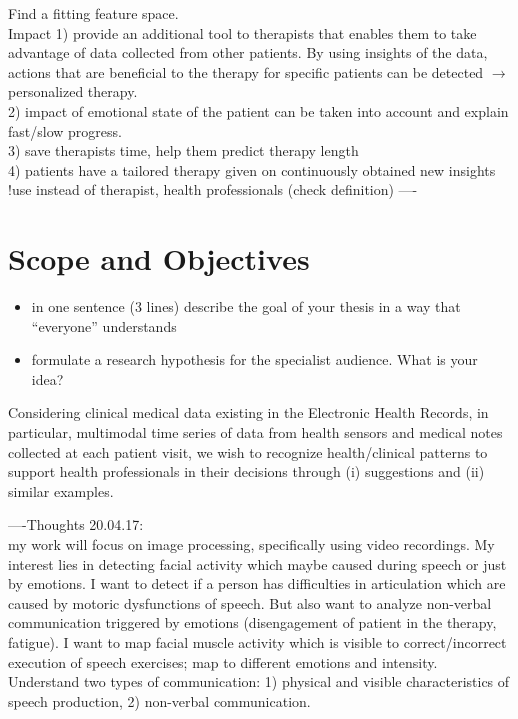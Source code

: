 Find a fitting feature space. \\


Impact 1) provide an additional tool to therapists that enables them to take advantage of data collected from other patients. By using insights of the data, actions that are beneficial to the therapy for specific patients can be detected $\rightarrow$ personalized therapy.\\
2) impact of emotional state of the patient can be taken into account and explain fast/slow progress.\\
3) save therapists time, help them predict therapy length\\
4) patients have a tailored therapy given on continuously obtained new insights\\ 
!use instead of therapist, health professionals (check definition)
----\\


\section{Scope and Objectives}

\begin{itemize}
    \item in one sentence (3 lines) describe the goal of your thesis in a way that ``everyone'' understands
    \item formulate a research hypothesis for the specialist audience. What is your idea?
\end{itemize}


Considering clinical medical data existing in the Electronic Health Records, in particular, multimodal time series of data from health sensors and medical notes collected at each patient visit, we wish to recognize health/clinical patterns to support health professionals in their decisions through (i) suggestions and (ii) similar examples.

----Thoughts 20.04.17:\\
my work will focus on image processing, specifically using video recordings. My interest lies in detecting facial activity which maybe caused during speech or just  by emotions. I want to detect if a person has difficulties in articulation which are caused by motoric dysfunctions of speech. But also want to analyze non-verbal communication triggered by emotions (disengagement of patient in the therapy, fatigue). I want to map facial muscle activity which is visible to correct/incorrect execution of speech exercises; map to different emotions and intensity. Understand two types of communication: 1) physical and visible characteristics of speech production, 2) non-verbal communication.\\

